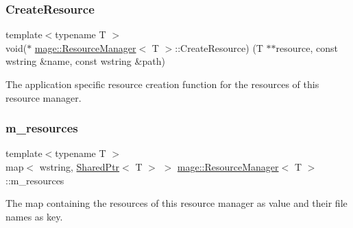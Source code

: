 \subsubsection{\texorpdfstring{Create\+Resource}{CreateResource}}
{\footnotesize\ttfamily template$<$typename T $>$ \\
void($\ast$ \hyperlink{classmage_1_1_resource_manager}{mage\+::\+Resource\+Manager}$<$ T $>$\+::Create\+Resource) (T $\ast$$\ast$resource, const wstring \&name, const wstring \&path)\hspace{0.3cm}{\ttfamily [private]}}

The application specific resource creation function for the resources of this resource manager. \hypertarget{classmage_1_1_resource_manager_a7d5f31a34e76f343988b7d6e9a62a617}{}\label{classmage_1_1_resource_manager_a7d5f31a34e76f343988b7d6e9a62a617} 
\subsubsection{\texorpdfstring{m\+\_\+resources}{m\_resources}}
{\footnotesize\ttfamily template$<$typename T $>$ \\
map$<$ wstring, \hyperlink{namespacemage_a1e01ae66713838a7a67d30e44c67703e}{Shared\+Ptr}$<$ T $>$ $>$ \hyperlink{classmage_1_1_resource_manager}{mage\+::\+Resource\+Manager}$<$ T $>$\+::m\+\_\+resources\hspace{0.3cm}{\ttfamily [private]}}

The map containing the resources of this resource manager as value and their file names as key. 